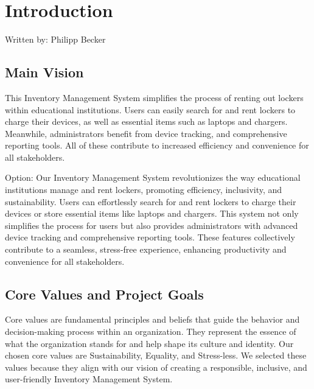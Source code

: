 \section{Introduction}
{\tiny Written by: Philipp Becker}\\
\subsection{Main Vision}
This Inventory Management System simplifies the process of renting out lockers within educational institutions. Users can easily search for and rent lockers to charge their devices, as well as essential items such as laptops and chargers. Meanwhile, administrators benefit from device tracking, and comprehensive reporting tools. All of these contribute to increased efficiency and convenience for all stakeholders.

Option:
Our Inventory Management System revolutionizes the way educational institutions manage and rent lockers, promoting efficiency, inclusivity, and sustainability. Users can effortlessly search for and rent lockers to charge their devices or store essential items like laptops and chargers. This system not only simplifies the process for users but also provides administrators with advanced device tracking and comprehensive reporting tools. These features collectively contribute to a seamless, stress-free experience, enhancing productivity and convenience for all stakeholders.

\subsection{Core Values and Project Goals}
Core values are fundamental principles and beliefs that guide the behavior and decision-making process within an organization. They represent the essence of what the organization stands for and help shape its culture and identity. Our chosen core values are Sustainability, Equality, and Stress-less. We selected these values because they align with our vision of creating a responsible, inclusive, and user-friendly Inventory Management System.

